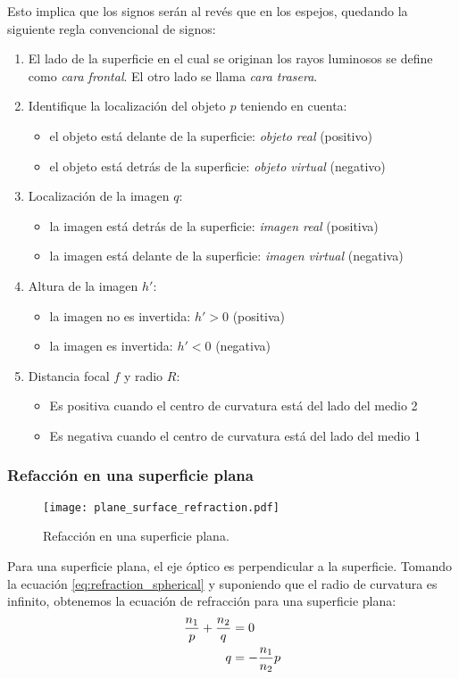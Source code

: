 \noindent Esto implica que los signos serán al revés que en los espejos, quedando la siguiente regla convencional de signos:
\begin{enumerate}
  \item El lado de la superficie en el cual se originan los rayos luminosos se define como \textit{cara frontal}. El otro lado se llama \textit{cara trasera}.
  \item Identifique la localización del objeto \(p\) teniendo en cuenta:
    \begin{itemize}
      \item el objeto está delante de la superficie: \textit{objeto real} (positivo)
      \item el objeto está detrás de la superficie: \textit{objeto virtual} (negativo)
    \end{itemize}
  \item  Localización de la imagen \(q\):
    \begin{itemize}
      \item la imagen está detrás de la superficie: \textit{imagen real} (positiva)
      \item la imagen está delante de la superficie: \textit{imagen virtual} (negativa)
    \end{itemize}
  \item Altura de la imagen \(h'\):
    \begin{itemize}
      \item la imagen no es invertida: \(h' > 0\) (positiva)
      \item la imagen es invertida: \(h' < 0\) (negativa)
    \end{itemize}
  \item Distancia focal \(f\) y radio \(R\):
    \begin{itemize}
      \item Es positiva cuando el centro de curvatura está del lado del medio 2
      \item Es negativa cuando el centro de curvatura está del lado del medio 1
    \end{itemize}
\end{enumerate}

\subsubsection{Refacción en una superficie plana}

\begin{wrapfigure}{r}{0.28\textwidth}
  \centering
  \texttt{[image: plane\_surface\_refraction.pdf]}
  \caption{Refacción en una superficie plana.}
  \label{fig:plane_surface_refraction}
\end{wrapfigure}
Para una superficie plana, el eje óptico es perpendicular a la superficie. Tomando la ecuación \ref{eq:refraction_spherical} y suponiendo que el radio de curvatura es infinito, obtenemos la ecuación de refracción para una superficie plana:
\begin{align}
  \frac{n_1}{p} + \frac{n_2}{q} &= 0 \notag \\
  q &= -\frac{n_1}{n_2} p
\end{align}

